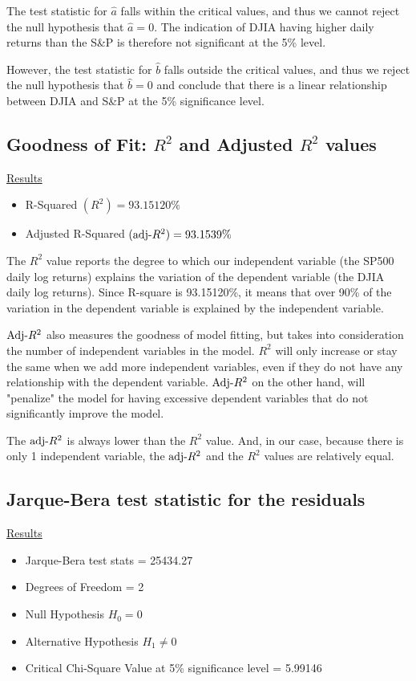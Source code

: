 \documentclass[a4paper]{article}
\begin{document}
	The test statistic for $\hat{a}$ falls within the critical values, and thus we cannot reject the null hypothesis that $\hat{a}=0$. The indication of DJIA having higher daily returns than the S\&P is therefore not significant at the 5\% level.  
	
	However, the test statistic for $\hat{b}$ falls outside the critical values, and thus we reject the null hypothesis that $\hat{b}=0$ and conclude that there is a linear relationship between DJIA and S\&P at the 5\% significance level. 
	
	
	\subsection{Goodness of Fit: $R^2$ and Adjusted $R^2$ values}
	\underline{Results}
	\begin{itemize}[nosep]
		\item R-Squared $(R^2) = 93.15120\%$
		\item Adjusted R-Squared $(\textnormal{adj-}R^2) = 93.1539\%$
	\end{itemize}

	The $R^2$ value reports the degree to which our independent variable (the SP500 daily log returns) explains the variation of the dependent variable (the DJIA daily log returns). Since R-square is 93.15120\%, it means that over 90\% of the variation in the dependent variable is explained by the independent variable.
	
	$\textnormal{Adj-}R^2$ also measures the goodness of model fitting, but takes into consideration the number of independent variables in the model. $R^2$ will only increase or  stay the same when we add more independent variables, even if they do not have any relationship with the dependent variable. $\textnormal{Adj-}R^2$ on the other hand, will "penalize" the model for having excessive dependent variables that do not significantly improve the model. 
	
	The $\textnormal{adj-}R^2$ is always lower than the $R^2$ value. And, in our case, because there is only 1 independent variable, the $\textnormal{adj-}R^2$ and the $R^2$ values are relatively equal.
	
	\subsection{Jarque-Bera test statistic for the residuals}
	\underline{Results}
	\begin{itemize}[nosep]
		\item Jarque-Bera test stats = 25434.27
		\item Degrees of Freedom = 2
		\item Null Hypothesis $H_0 = 0$
		\item Alternative Hypothesis $H_1 \ne 0$
		\item Critical Chi-Square Value at 5\% significance level = 5.99146
	\end{itemize}
	
\end{document}
